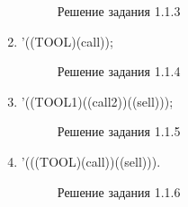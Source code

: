 \documentclass[12pt]{report}
\begin{document}
\begin{enumerate}
\begin{figure}[!h]
		\caption{Решение задания 1.1.3}
	\end{figure}
	\item '((TOOL)(call));
	\begin{figure}[!h]
		\caption{Решение задания 1.1.4}
	\end{figure}
	\item '((TOOL1)((call2))((sell)));
	\begin{figure}[!h]
		\caption{Решение задания 1.1.5}
	\end{figure}
	\item '(((TOOL)(call))((sell))).
	\begin{figure}[!h]
		\caption{Решение задания 1.1.6}
	\end{figure}
\end{enumerate}
\end{document}
